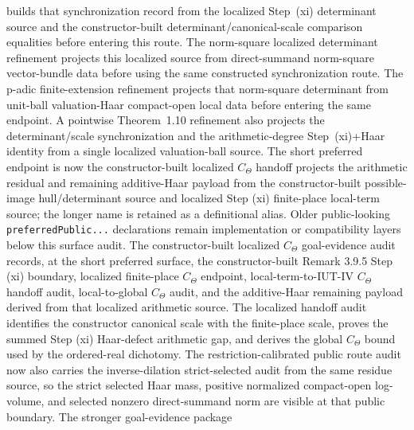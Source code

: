 \begin{proposition}
  builds that synchronization record from the localized Step~(xi) determinant
  source and the constructor-built determinant/canonical-scale comparison
  equalities before entering this route.  The norm-square localized
  determinant refinement projects this localized source from direct-summand
  norm-square vector-bundle data before using the same constructed
  synchronization route.  The p-adic finite-extension refinement projects that
  norm-square determinant from unit-ball valuation-Haar compact-open local data
  before entering the same endpoint.  A pointwise Theorem~1.10 refinement also
  projects the determinant/scale synchronization and the arithmetic-degree
  Step~(xi)+Haar identity from a single localized valuation-ball source.
  The short preferred
  endpoint is now the constructor-built localized \(C_\Theta\) handoff
  projects the arithmetic residual and remaining additive-Haar payload from the
  constructor-built possible-image hull/determinant source and localized
  Step (xi) finite-place local-term source; the longer name
  is retained as a definitional alias.  Older public-looking
  \texttt{preferredPublic...}
  declarations remain implementation or compatibility layers below this
  surface audit.  The constructor-built localized \(C_\Theta\) goal-evidence
  audit
  records, at the short preferred surface, the constructor-built Remark 3.9.5
  Step (xi) boundary, localized finite-place \(C_\Theta\) endpoint,
  local-term-to-IUT-IV \(C_\Theta\) handoff audit, local-to-global
  \(C_\Theta\) audit, and the additive-Haar remaining payload derived from that
  localized arithmetic source.  The localized handoff audit identifies the
  constructor canonical scale with the finite-place scale, proves the summed
  Step (xi) Haar-defect arithmetic gap, and derives the global \(C_\Theta\)
  bound used by the ordered-real dichotomy.  The restriction-calibrated public
  route audit now also carries the inverse-dilation strict-selected audit from
  the same residue source, so the strict selected Haar mass, positive
  normalized compact-open log-volume, and selected nonzero direct-summand norm
  are visible at that public boundary.  The stronger goal-evidence package

\end{proposition}
